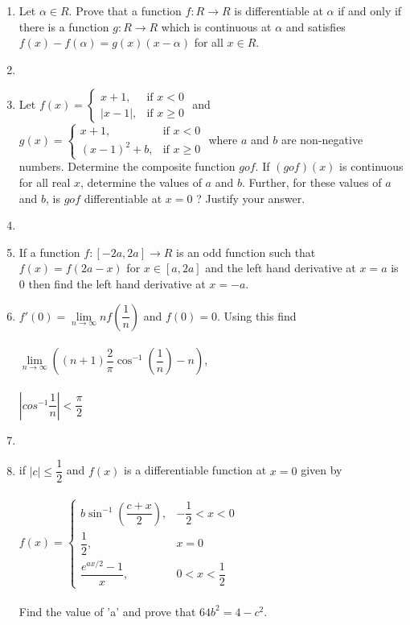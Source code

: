 \begin{enumerate}[label=\arabic*.,ref=\thesubsection.\theenumi]
\item Let $\alpha \in R$. Prove that a function $f:R \to R$ is differentiable at $\alpha$ if and only if there is a function $g: R \to R$ which is continuous at $\alpha$ and satisfies $f(x)-f(\alpha)=g(x)(x-\alpha)$ for all $x \in R$. \item[~]

\item Let $f(x)=\begin{cases}
x+1, &\text{if $x<0$}\\
|x-1|, &\text{if $x\geq 0$}
\end{cases}$ and\\ $g(x)=\begin{cases}
x+1, &\text{if $x<0$}\\
(x-1)^2+b, &\text{if $x\geq 0$}
\end{cases}$ where $a$ and $b$ are non-negative numbers. Determine the composite function $g o f$. If $(g o f) (x)$ is continuous for all real $x$, determine the values of $a$ and $b$. Further, for these values of $a$ and $b$, is $g o f$ differentiable at $x=0$ ? Justify your answer. \item[~]

\item If a function $f:[-2a,2a] \to R$ is an odd function such that $f(x)=f(2a-x)$ for $x \in [a,2a]$ and the left hand derivative at $x=a$ is 0 then find the left hand derivative at $x=-a$.

\item $f'(0)=\lim\limits_{n \to \infty}nf\left(\dfrac{1}{n}\right)$ and $f(0)=0$. Using this find\\ \\ $\lim\limits_{n \to \infty}\left((n+1)\dfrac{2}{\pi}\cos^{-1}\left(\dfrac{1}{n}\right)-n\right)$, \\ \\$\left|cos^{-1}\dfrac{1}{n}\right| < \dfrac{\pi}{2}$

\item[~] \item if $|c|\leq\dfrac{1}{2}$ and $f(x)$ is a differentiable function at $x=0$ given by \\ \\
$f(x)=\begin{cases}
b\sin^{-1}\left(\dfrac{c+x}{2}\right), &\text{$-\dfrac{1}{2}<x<0$}\\
\dfrac{1}{2}, &\text{$x=0$}\\
\dfrac{e^{ax/2}-1}{x}, &\text{$0<x<\dfrac{1}{2}$}
\end{cases}$\\ \\
Find the value of 'a' and prove that $64b^2=4-c^2$.\\


\end{enumerate}
